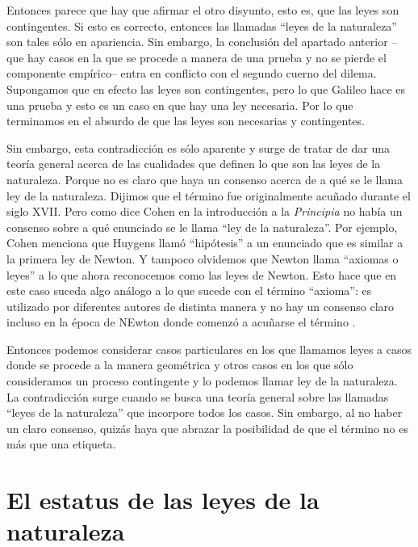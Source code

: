 Entonces parece que hay que afirmar el otro disyunto, esto es, que las leyes son contingentes. Si esto es correcto, entonces las llamadas ``leyes de la naturaleza'' son tales sólo en apariencia. Sin embargo, la conclusión del apartado anterior --que hay casos  en la que se procede a manera de una prueba y no se pierde el componente empírico-- entra en conflicto con el segundo cuerno del dilema. Supongamos que en efecto las leyes son contingentes, pero lo que Galileo hace es una prueba y esto es un caso en que hay una ley necesaria. Por lo que terminamos en el absurdo de que las leyes son necesarias y contingentes.

Sin embargo, esta contradicción es sólo aparente y surge de tratar de dar una teoría general acerca de las cualidades que definen lo que son las leyes de la naturaleza. Porque no es claro que haya un consenso acerca de a qué se le llama ley de la naturaleza. Dijimos que el término fue originalmente acuñado durante el siglo XVII. Pero como dice Cohen en la introducción a la \textit{Principia} \cite{principia} no había un consenso sobre a qué enunciado se le llama ``ley de la naturaleza''. Por ejemplo, Cohen menciona que Huygens llamó ``hipótesis'' a un enunciado que es similar a la primera ley de Newton. Y tampoco olvidemos que Newton llama ``axiomas o leyes'' a lo que ahora reconocemos como las leyes de Newton. Esto hace que en este caso suceda algo análogo a lo que sucede con el término ``axioma'': es utilizado por diferentes autores de distinta manera y no hay un consenso claro incluso en la época de NEwton donde comenzó a acuñarse el término \cite{heath2015}.

Entonces podemos considerar casos particulares en los que llamamos leyes a casos donde se procede a la manera geométrica y otros casos en los que sólo consideramos un proceso contingente y lo podemos llamar ley de la naturaleza. La contradicción surge cuando se busca una teoría general sobre las llamadas ``leyes de la naturaleza'' que incorpore todos los casos. Sin embargo, al no haber un claro consenso, quizás haya que abrazar la posibilidad de que el término no es más que una etiqueta.

\section{El estatus de las leyes de la naturaleza}

